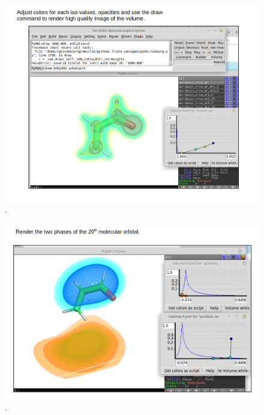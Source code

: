 \documentclass[a4paper,11pt]{refart}
\begin{document}
\hspace*{-\leftmarginwidth}
\begin{minipage}{\fullwidth}
	\begin{figure}[H]
		\begin{center}
			\includegraphics[width=6in]{images/T4_img3}
			\caption{.}
			\label{T4_img3}
		\end{center}
	\end{figure}
\end{minipage}

\hspace*{-\leftmarginwidth}
\begin{minipage}{\fullwidth}
	\begin{figure}[H]
		\begin{center}
			\includegraphics[width=6in]{images/T4_img4}
			\caption{.}
			\label{T4_img4}
		\end{center}
	\end{figure}
\end{minipage}
\end{document}
